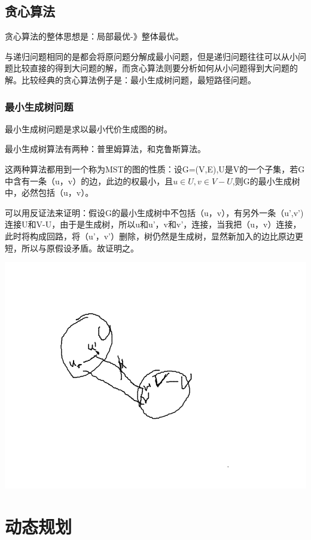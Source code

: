 \documentclass{article}
\begin{document}
	\subsection{贪心算法}
	贪心算法的整体思想是：局部最优-》整体最优。

	与递归问题相同的是都会将原问题分解成最小问题，但是递归问题往往可以从小问题比较直接的得到大问题的解，而贪心算法则要分析如何从小问题得到大问题的解。比较经典的贪心算法例子是：最小生成树问题，最短路径问题。

	\subsubsection{最小生成树问题}
	最小生成树问题是求以最小代价生成图的树。
	
	最小生成树算法有两种：普里姆算法，和克鲁斯算法。

	这两种算法都用到一个称为MST的图的性质：设G=(V,{E}),U是V的一个子集，若G中含有一条（u，v）的边，此边的权最小，且$u\in{U},v\in{V-U}$,则G的最小生成树中，必然包括（u，v）。

	可以用反证法来证明：假设G的最小生成树中不包括（u，v），有另外一条（u',v')连接U和V-U，由于是生成树，所以u和u'，v和v'，连接，当我把（u，v）连接，此时将构成回路，将（u'，v'）删除，树仍然是生成树，显然新加入的边比原边更短，所以与原假设矛盾。故证明之。

	\includegraphics[scale=0.4]{./pic/graph-04.png}	


\section{动态规划}
\end{document}
